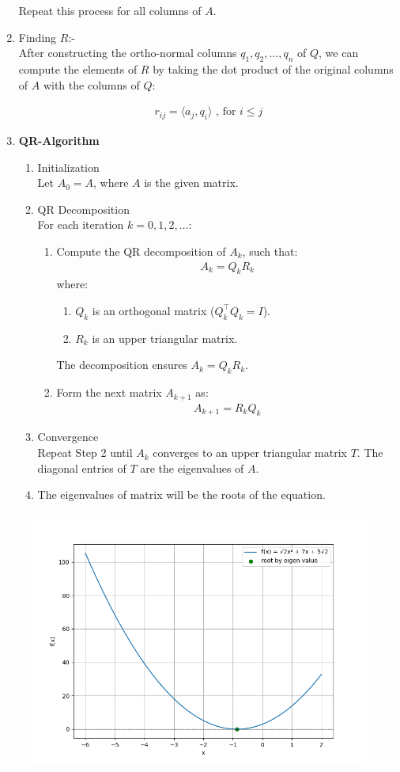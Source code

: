 \documentclass[journal]{IEEEtran}
\numberwithin{equation}{enumi}
\numberwithin{figure}{enumi}
\begin{document}
\begin{enumerate}
Repeat this process for all columns of \( A \).
\item Finding $R$:- \\
After constructing the ortho-normal columns $ q_1, q_2, \dots, q_n $ of $Q$, we can compute the elements of $R$ by taking the dot product of the original columns of $A$ with the columns of $Q$:

\begin{align}
    r_{ij} = \langle a_j, q_i \rangle \text{ , for  }  i \leq j 
\end{align}
\item \textbf{QR-Algorithm}\\
\begin{enumerate}
\item Initialization \\
Let $A_0 = A $, where $A$ is the given matrix.

\item QR Decomposition \\
For each iteration $ k = 0, 1, 2, \dots $:
\begin{enumerate}
    \item Compute the QR decomposition of \( A_k \), such that:
    \begin{align}
    A_k = Q_k R_k
    \end{align}
    where:
    \begin{enumerate}
        \item $Q_k $ is an orthogonal matrix ($ Q_k^\top Q_k = I $).
        \item $ R_k $ is an upper triangular matrix.
    \end{enumerate}
    The decomposition ensures $ A_k = Q_k R_k $.

    \item Form the next matrix \( A_{k+1} \) as:
    \begin{align}
    A_{k+1} = R_k Q_k
    \end{align}
\end{enumerate}
\item Convergence\\
Repeat Step 2 until $ A_k $ converges to an upper triangular matrix $ T $. The diagonal entries of $T$ are the eigenvalues of $A$.\\
\item The eigenvalues of matrix will be the roots of the equation.

\end{enumerate}



\end{enumerate}

\begin{figure}[h!]
   \centering
   \includegraphics[width=0.7\linewidth]{figs/fig.png}
\end{figure}
\end{document}
